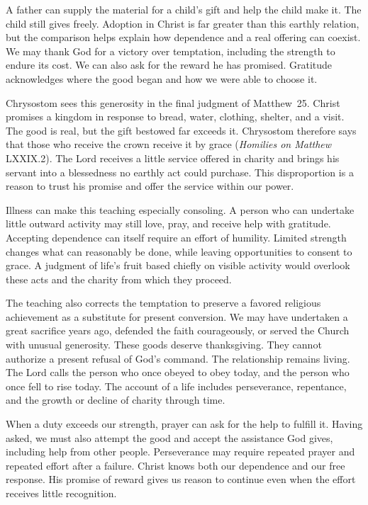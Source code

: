 A father can supply the material for a child's gift and help the child make it. The child still gives freely. Adoption in Christ is far greater than this earthly relation, but the comparison helps explain how dependence and a real offering can coexist. We may thank God for a victory over temptation, including the strength to endure its cost. We can also ask for the reward he has promised. Gratitude acknowledges where the good began and how we were able to choose it.

Chrysostom sees this generosity in the final judgment of Matthew~25. Christ promises a kingdom in response to bread, water, clothing, shelter, and a visit. The good is real, but the gift bestowed far exceeds it. Chrysostom therefore says that those who receive the crown receive it by grace (\emph{Homilies on Matthew} LXXIX.2). The Lord receives a little service offered in charity and brings his servant into a blessedness no earthly act could purchase. This disproportion is a reason to trust his promise and offer the service within our power.

Illness can make this teaching especially consoling. A person who can undertake little outward activity may still love, pray, and receive help with gratitude. Accepting dependence can itself require an effort of humility. Limited strength changes what can reasonably be done, while leaving opportunities to consent to grace. A judgment of life's fruit based chiefly on visible activity would overlook these acts and the charity from which they proceed.

The teaching also corrects the temptation to preserve a favored religious achievement as a substitute for present conversion. We may have undertaken a great sacrifice years ago, defended the faith courageously, or served the Church with unusual generosity. These goods deserve thanksgiving. They cannot authorize a present refusal of God's command. The relationship remains living. The Lord calls the person who once obeyed to obey today, and the person who once fell to rise today. The account of a life includes perseverance, repentance, and the growth or decline of charity through time.

When a duty exceeds our strength, prayer can ask for the help to fulfill it. Having asked, we must also attempt the good and accept the assistance God gives, including help from other people. Perseverance may require repeated prayer and repeated effort after a failure. Christ knows both our dependence and our free response. His promise of reward gives us reason to continue even when the effort receives little recognition.


